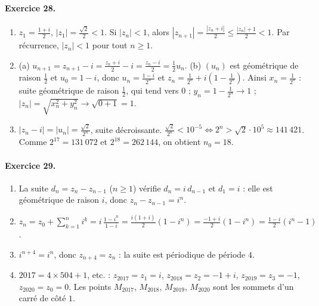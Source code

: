\begin{corrige}
\paragraph{Exercice 28.}
\begin{enumerate}
\item $z_1 = \frac{1 + i}{2}$, $|z_1| = \frac{\sqrt{2}}{2} < 1$. Si $|z_n| < 1$, alors $|z_{n+1}| = \frac{|z_n + i|}{2} \leq \frac{|z_n| + 1}{2} < 1$.
      Par r\'ecurrence, $|z_n| < 1$ pour tout $n \geq 1$.
\item (a) $u_{n+1} = z_{n+1} - i = \frac{z_n + i}{2} - i = \frac{z_n - i}{2} = \frac{1}{2}u_n$.
      (b) $(u_n)$ est g\'eom\'etrique de raison $\frac{1}{2}$ et $u_0 = 1 - i$, donc $u_n = \frac{1 - i}{2^n}$ et $z_n = \frac{1}{2^n} + i\left(1 - \frac{1}{2^n}\right)$.
      Ainsi $x_n = \frac{1}{2^n}$ : suite g\'eom\'etrique de raison $\frac{1}{2}$, qui tend vers $0$ ; $y_n = 1 - \frac{1}{2^n} \to 1$ ;
      $|z_n| = \sqrt{x_n^2 + y_n^2} \to \sqrt{0 + 1} = 1$.
\item $|z_n - i| = |u_n| = \frac{\sqrt{2}}{2^n}$, suite d\'ecroissante. $\frac{\sqrt{2}}{2^n} < 10^{-5} \iff 2^n > \sqrt{2}\cdot 10^5 \approx 141\,421$.
      Comme $2^{17} = 131\,072$ et $2^{18} = 262\,144$, on obtient $\boxed{n_0 = 18}$.
\end{enumerate}

\paragraph{Exercice 29.}
\begin{enumerate}
\item La suite $d_n = z_n - z_{n-1}$ ($n \geq 1$) v\'erifie $d_n = i\,d_{n-1}$ et $d_1 = i$ : elle est g\'eom\'etrique de raison $i$, donc $z_n - z_{n-1} = i^n$.
\item $z_n = z_0 + \sum_{k=1}^{n} i^k = i\,\frac{1 - i^n}{1 - i} = \frac{i(1+i)}{2}(1 - i^n) = \frac{-1 + i}{2}(1 - i^n) = \frac{1 - i}{2}(i^n - 1)$.
\item $i^{n+4} = i^n$, donc $z_{n+4} = z_n$ : la suite est p\'eriodique de p\'eriode $4$.
\item $2017 = 4\times 504 + 1$, etc. : $z_{2017} = z_1 = i$, $z_{2018} = z_2 = -1 + i$, $z_{2019} = z_3 = -1$, $z_{2020} = z_0 = 0$.
      Les points $M_{2017}$, $M_{2018}$, $M_{2019}$, $M_{2020}$ sont les sommets d'un carr\'e de c\^ot\'e $1$.
\end{enumerate}


\end{corrige}
